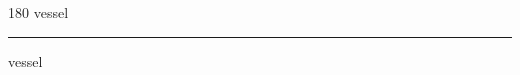 
\begin{frame}
\begin{center}
\begin{turn}{180}
{\fontsize{2.5cm}{1em}\selectfont vessel}
\end{turn}
\vspace{1em}\par  
\hrule
\vspace{1em}\par  
{\fontsize{2.5cm}{1em}\selectfont vessel}
\end{center}
\end{frame}
